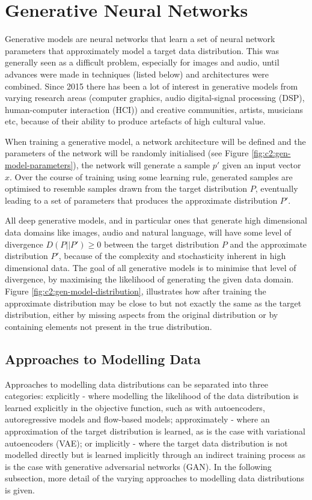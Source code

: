  
\section{Generative Neural Networks}

Generative models are neural networks that learn a set of neural network parameters that approximately model a target data distribution. 
This was generally seen as a difficult problem, especially for images and audio, until advances were made in techniques (listed below) and architectures were combined. 
Since 2015 there has been a lot of interest in generative models from varying research areas (computer graphics, audio digital-signal processing (DSP), human-computer interaction (HCI)) and creative communities, artists, musicians etc, because of their ability to produce artefacts of high cultural value. 

When training a generative model, a network architecture will be defined and the parameters of the network will be randomly initialised (see Figure \ref{fig:c2:gen-model-parameters}), the network will generate a sample $p'$ given an input vector $x$. 
Over the course of training using some learning rule, generated samples are optimised to resemble samples drawn from the target distribution $P$, eventually leading to a set of parameters that produces the approximate distribution $P'$.

All deep generative models, and in particular ones that generate high dimensional data domains like images, audio and natural language, will have some level of divergence $D(P||P') \geq 0$ between the target distribution $P$ and the approximate distribution $P'$, because of the complexity and stochasticity inherent in high dimensional data. 
The goal of all generative models is to minimise that level of divergence, by maximising the likelihood of generating the given data domain. 
Figure \ref{fig:c2:gen-model-distribution}, illustrates how after training the approximate distribution may be close to but not exactly the same as the target distribution, either by missing aspects from the original distribution or by containing elements not present in the true distribution. 

\subsection{Approaches to Modelling Data}

Approaches to modelling data distributions can be separated into three categories: explicitly - where modelling the likelihood of the data distribution is learned explicitly in the objective function, such as with autoencoders, autoregressive models and flow-based models; approximately - where an approximation of the target distribution is learned, as is the case with variational autoencoders (VAE); or implicitly - where the target data distribution is not modelled directly but is learned implicitly through an indirect training process as is the case with generative adversarial networks (GAN).
In the following subsection, more detail of the varying approaches to modelling data distributions is given. 

